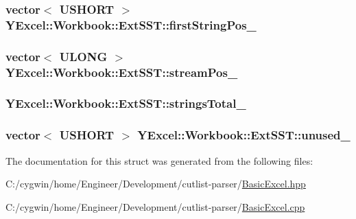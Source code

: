 \subsubsection[{first\+String\+Pos\+\_\+}]{\setlength{\rightskip}{0pt plus 5cm}vector$<$ {\bf U\+S\+H\+O\+R\+T} $>$ Y\+Excel\+::\+Workbook\+::\+Ext\+S\+S\+T\+::first\+String\+Pos\+\_\+}\label{struct_y_excel_1_1_workbook_1_1_ext_s_s_t_a10639f12d8fc736003f16da194ceab98}
\hypertarget{struct_y_excel_1_1_workbook_1_1_ext_s_s_t_a391c60203fcba748a44ff701ac6930d4}{}
\subsubsection[{stream\+Pos\+\_\+}]{\setlength{\rightskip}{0pt plus 5cm}vector$<$ {\bf U\+L\+O\+N\+G} $>$ Y\+Excel\+::\+Workbook\+::\+Ext\+S\+S\+T\+::stream\+Pos\+\_\+}\label{struct_y_excel_1_1_workbook_1_1_ext_s_s_t_a391c60203fcba748a44ff701ac6930d4}
\hypertarget{struct_y_excel_1_1_workbook_1_1_ext_s_s_t_acf8f2203f77e4676f74e9cedfe708f6f}{}
\subsubsection[{strings\+Total\+\_\+}]{ Y\+Excel\+::\+Workbook\+::\+Ext\+S\+S\+T\+::strings\+Total\+\_\+}\label{struct_y_excel_1_1_workbook_1_1_ext_s_s_t_acf8f2203f77e4676f74e9cedfe708f6f}
\hypertarget{struct_y_excel_1_1_workbook_1_1_ext_s_s_t_a41f220283aec8c7e6e3c89a0b1ae245d}{}
\subsubsection[{unused\+\_\+}]{\setlength{\rightskip}{0pt plus 5cm}vector$<$ {\bf U\+S\+H\+O\+R\+T} $>$ Y\+Excel\+::\+Workbook\+::\+Ext\+S\+S\+T\+::unused\+\_\+}\label{struct_y_excel_1_1_workbook_1_1_ext_s_s_t_a41f220283aec8c7e6e3c89a0b1ae245d}


The documentation for this struct was generated from the following files\+:\begin{DoxyCompactItemize}
\item 
C\+:/cygwin/home/\+Engineer/\+Development/cutlist-\/parser/\hyperlink{_basic_excel_8hpp}{Basic\+Excel.\+hpp}\item 
C\+:/cygwin/home/\+Engineer/\+Development/cutlist-\/parser/\hyperlink{_basic_excel_8cpp}{Basic\+Excel.\+cpp}\end{DoxyCompactItemize}
